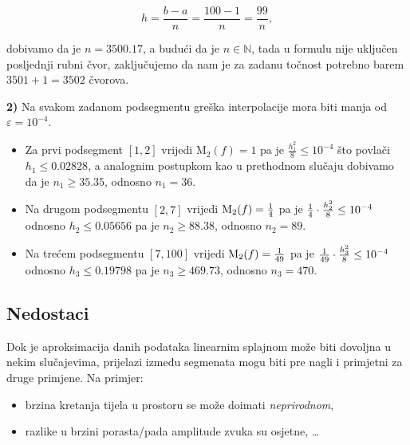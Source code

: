 $$
h=\frac{b-a}{n}=\frac{100-1}{n}=\frac{99}{n},
$$

dobivamo da je $n=3500.17$, a budući da je $n\in\mathbb{N}$, tada u formulu nije uključen posljednji rubni čvor, zaključujemo da nam je za zadanu točnost potrebno barem $3501+1=3502$ čvorova.

\bigskip

\textbf{2)} Na svakom zadanom podsegmentu greška interpolacije mora biti manja od $\varepsilon=10^{-4}$.

\begin{itemize}
    \item Za prvi podsegment $[1,2]$ vrijedi $\text{M}_2(f) = 1$ pa je $\frac{h_1^2}{8}\leq10^{-4}$ što povlači $h_1\leq0.02828$, a analognim postupkom kao u prethodnom slučaju dobivamo da je $n_1\geq35.35$, odnosno $n_1=36$.
    \item Na drugom podsegmentu $[2,7]$ vrijedi $\text{M}_2(f) = {1\over4}$ pa je ${1\over4}\cdot\frac{h_2^2}{8}\leq10^{-4}$ odnosno $h_2\leq0.05656$ pa je $n_2\geq88.38$, odnosno $n_2=89$.
    \item Na trećem podsegmentu $[7,100]$ vrijedi $\text{M}_2(f) = {1\over49}$ pa je ${1\over49}\cdot\frac{h_3^2}{8}\leq10^{-4}$ odnosno $h_3\leq0.19798$ pa je $n_3\geq469.73$, odnosno $n_3=470$.
\end{itemize}

\subsection{Nedostaci}

Dok je aproksimacija danih podataka linearnim splajnom može biti dovoljna u nekim slučajevima, prijelazi između segmenata mogu biti pre nagli i primjetni za druge primjene. Na primjer:

\begin{itemize}
    \item brzina kretanja tijela u prostoru se može doimati \textit{neprirodnom},
    \item razlike u brzini porasta/pada amplitude zvuka su osjetne, \dots
\end{itemize}

